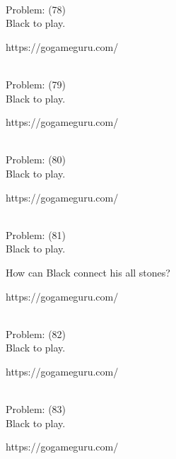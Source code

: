 \documentclass[11pt]{article}
\begin{document}
\begin{minipage}[t]{0.5\textwidth}
  {\centering
  
\\
Problem: (78)\\
Black to play.

https://gogameguru.com/\\
  }
\end{minipage}
\begin{minipage}[t]{0.5\textwidth}
  {\centering
  
\\
Problem: (79)\\
Black to play.

https://gogameguru.com/\\
  }
\end{minipage}
\begin{minipage}[t]{0.5\textwidth}
  {\centering
  
\\
Problem: (80)\\
Black to play.

https://gogameguru.com/\\
  }
\end{minipage}
\begin{minipage}[t]{0.5\textwidth}
  {\centering
  
\\
Problem: (81)\\
Black to play.

How can Black connect his all stones?

https://gogameguru.com/\\
  }
\end{minipage}
\begin{minipage}[t]{0.5\textwidth}
  {\centering
  
\\
Problem: (82)\\
Black to play.

https://gogameguru.com/\\
  }
\end{minipage}
\begin{minipage}[t]{0.5\textwidth}
  {\centering
  
\\
Problem: (83)\\
Black to play.

https://gogameguru.com/\\
  }
\end{minipage}
\end{document}
